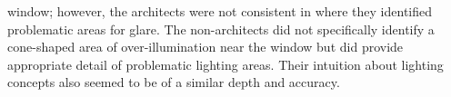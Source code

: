 \documentclass{article}
\begin{document}
window; however, the architects were not consistent in
where they identified problematic areas for glare.  
%
The non-architects did
not specifically identify a cone-shaped area of over-illumination near
the window but did provide appropriate detail of problematic lighting
areas.  Their intuition about lighting concepts also seemed to be of a
similar depth and accuracy.  




\end{document}

